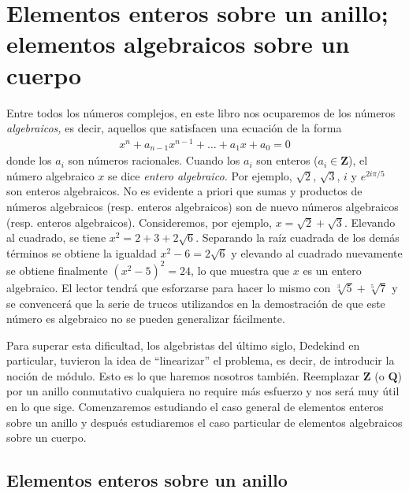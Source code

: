 \documentclass[bibtotoc,leqno,spanish]{amsbook}
\newcommand{\QQ}{\mathbf{Q}}
\newcommand{\ZZ}{\mathbf{Z}}
\numberwithin{equation}{section}
\theoremstyle{note}
\theoremstyle{note}
\theoremstyle{rem}
\numberwithin{theorem}{section}
\numberwithin{proposition}{section}
\numberwithin{definition}{section}
\numberwithin{lemma}{section}
\numberwithin{corollary}{section}
\numberwithin{example}{section}
\numberwithin{footnote}{section}%
\begin{document}
\chapter[Elementos enteros sobre un anillo]
{Elementos enteros sobre un anillo; elementos algebraicos sobre un cuerpo}
\label{cap2}

Entre todos los n\'umeros complejos, en este libro nos ocuparemos de los n\'umeros
{\em algebraicos,} es decir, aquellos que satisfacen una ecuaci\'on de la forma
\begin{gather*}
x^{n}+a_{n-1}x^{n-1}+\dots+a_{1}x+a_{0} = 0
\end{gather*}
donde los $a_{i}$ son n\'umeros racionales. Cuando los $a_{i}$ son enteros
($a_{i}\in\ZZ$), el n\'umero algebraico $x$ se dice {\em entero algebraico.}
Por ejemplo, $\sqrt{2}$, $\sqrt{3}$, $i$ y $e^{2i\pi/5}$ son enteros algebraicos. No es evidente
a priori que sumas y productos de n\'umeros algebraicos (resp. enteros algebraicos) son
de nuevo n\'umeros algebraicos (resp. enteros algebraicos). Consideremos, por ejemplo,
$x = \sqrt{2}+\sqrt{3}$. Elevando al cuadrado, se tiene $x^{2} = 2+3+2\sqrt{6}$.
Separando la ra\'iz cuadrada de los dem\'as t\'erminos se obtiene la igualdad $x^{2}-6=2\sqrt{6}$ y
elevando al cuadrado nuevamente se obtiene finalmente $(x^{2}-5)^{2}=24$, lo que muestra que
$x$ es un entero algebraico. El lector tendr\'a que esforzarse para hacer lo mismo con
$\sqrt[3]{5}+\sqrt[5]{7}$ y se convencer\'a que la serie de trucos utilizandos en la demostraci\'on de
que este n\'umero es algebraico no se pueden generalizar f\'acilmente.

Para superar esta dificultad, los algebristas del \'ultimo siglo, Dedekind en particular, tuvieron
la idea de ``linearizar'' el problema, es decir, de introducir la noci\'on de m\'odulo. Esto es lo que haremos nosotros
tambi\'en. Reemplazar $\ZZ$ (o $\QQ$) por un anillo conmutativo cualquiera no require m\'as esfuerzo
y nos ser\'a muy \'util en lo que sige. Comenzaremos estudiando el caso general de elementos enteros sobre un
anillo y despu\'es estudiaremos el caso particular de elementos algebraicos sobre un cuerpo.

\section{Elementos enteros sobre un anillo}\label{sec2.1}
\end{document}
